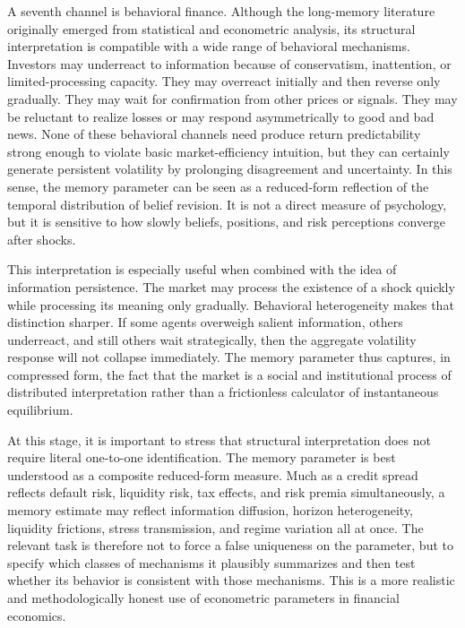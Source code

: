 \documentclass[12pt]{article}
\begin{document}
A seventh channel is behavioral finance. Although the long-memory literature originally emerged from statistical and econometric analysis, its structural interpretation is compatible with a wide range of behavioral mechanisms. Investors may underreact to information because of conservatism, inattention, or limited-processing capacity. They may overreact initially and then reverse only gradually. They may wait for confirmation from other prices or signals. They may be reluctant to realize losses or may respond asymmetrically to good and bad news. None of these behavioral channels need produce return predictability strong enough to violate basic market-efficiency intuition, but they can certainly generate persistent volatility by prolonging disagreement and uncertainty. In this sense, the memory parameter can be seen as a reduced-form reflection of the temporal distribution of belief revision. It is not a direct measure of psychology, but it is sensitive to how slowly beliefs, positions, and risk perceptions converge after shocks.

This interpretation is especially useful when combined with the idea of information persistence. The market may process the existence of a shock quickly while processing its meaning only gradually. Behavioral heterogeneity makes that distinction sharper. If some agents overweigh salient information, others underreact, and still others wait strategically, then the aggregate volatility response will not collapse immediately. The memory parameter thus captures, in compressed form, the fact that the market is a social and institutional process of distributed interpretation rather than a frictionless calculator of instantaneous equilibrium.

At this stage, it is important to stress that structural interpretation does not require literal one-to-one identification. The memory parameter is best understood as a composite reduced-form measure. Much as a credit spread reflects default risk, liquidity risk, tax effects, and risk premia simultaneously, a memory estimate may reflect information diffusion, horizon heterogeneity, liquidity frictions, stress transmission, and regime variation all at once. The relevant task is therefore not to force a false uniqueness on the parameter, but to specify which classes of mechanisms it plausibly summarizes and then test whether its behavior is consistent with those mechanisms. This is a more realistic and methodologically honest use of econometric parameters in financial economics.
\end{document}
